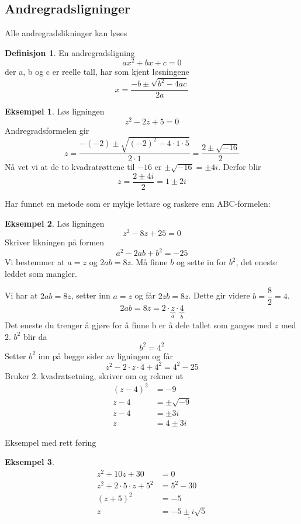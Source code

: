 \documentclass[11pt]{article}
\theoremstyle{definition}
\newtheorem{mindef}{Definisjon}[section]
\newenvironment{fmindef}
{\begin{mdframed}[style=minstil]\begin{mindef}}
		{\end{mindef}\end{mdframed}}
\theoremstyle{definition}
\newtheorem{mitteks}{Eksempel}[section]
\newenvironment{fmitteks}
{\begin{mdframed}[style=minstil]\begin{mitteks}}
		{\end{mitteks}\end{mdframed}}
\theoremstyle{definition}
\theoremstyle{definition}
\theoremstyle{definition}
\theoremstyle{definition}
\begin{document}
	\newpage
	
	\subsection{Andregradsligninger}
	Alle andregradslikninger kan løses 
	
	\begin{fmindef}
		En andregradsligning \[ax^2+bx+c=0\] der a, b og c er reelle tall, har som kjent løsningene \[x=\dfrac{-b\pm \sqrt{b^2-4ac}}{2a}\]
	\end{fmindef}
	
	
	\begin{fmitteks}
		Løs ligningen \[z^2-2z+5=0\] Andregradsformelen gir 
		\[z=\dfrac{-(-2)\pm \sqrt{(-2)^2-4\cdot 1 \cdot 5}}{2 \cdot 1}=\dfrac{2 \pm \sqrt{-16}}{2} \]
		Nå vet vi at de to kvadratrøttene til \(-16\) er \(\pm \sqrt{-16}=\pm 4 i \). Derfor blir \[z=\dfrac{2\pm 4i}{2}=1\pm 2i \]
	\end{fmitteks}
	
	
\newpage

	Har funnet en metode som er mykje lettare og raskere enn ABC-formelen:
	
	\begin{fmitteks}
		Løs ligningen \[z^2-8z+25=0\]
		Skriver likningen på formen \[a^2-2ab+b^2 = -25\]
		Vi bestemmer at \(a=z\) og \(2ab=8z\). Må finne \(b\) og sette in for \(b^2\), det eneste leddet som mangler.
		
		Vi har at \(2ab=8z\), setter inn \(a=z\) og får \(2zb=8z\). Dette gir videre \(b=\dfrac{8}{2}=4\). 
		\[2ab=8z=2\cdot \underbrace{z}_a \cdot \underbrace{4}_b\] 
		Det eneste du trenger å gjøre for å finne b er å dele tallet som ganges med \(z\) med \(2\). \(b^2\) blir da \[b^2=4^2\]
		Setter \(b^2\) inn på begge sider av ligningen og får
		\[z^2-2\cdot z\cdot 4+4^2=4^2-25\]
		Bruker 2. kvadratsetning, skriver om og rekner ut
		\begin{align*}
		(z-4)^2&=-9        \\
		z-4&=\pm \sqrt{-9} \\
		z-4&=\pm 3i        \\
		z&=4\pm 3i
		\end{align*}
	\end{fmitteks}
	
	Eksempel med rett føring
	
	\begin{fmitteks}
		\begin{align*}
		z^2+10z+30&=0 						 \\
		z^2+2\cdot 5\cdot z + 5^2 &= 5^2 -30 \\
		(z+5)^2&=-5                          \\
		z&=\underline{\underline{-5\pm i\sqrt{5}}}
		\end{align*}
	\end{fmitteks}
	
\end{document}
